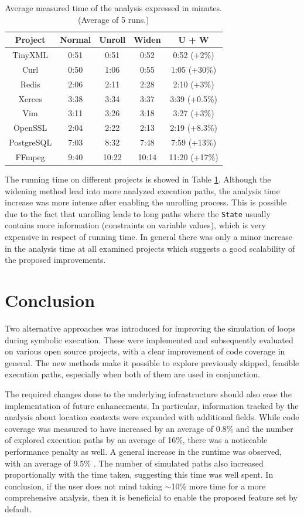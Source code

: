 \documentclass[oneside, a4paper, 12pt]{article}
\theoremstyle{definition}
\begin{document}
\begin{table}[!htb]
	\centering
\begin{tabular}{ |c||c|c|c|c| } 
	\hline
	Project & Normal & Unroll & Widen & U + W \\
	\hline \hline
	TinyXML & 0:51 & 0:51 & 0:52 & 0:52 (+2\%) \\ 
	\hline
	Curl & 0:50 & 1:06 & 0:55 & 1:05 (+30\%) \\ 
	\hline
	Redis & 2:06 & 2:11 & 2:28 & 2:10 (+3\%) \\ 
	\hline
	Xerces & 3:38 & 3:34 & 3:37 & 3:39 (+0.5\%) \\ 
	\hline
	Vim & 3:11 & 3:26 & 3:18 & 3:27 (+3\%) \\
	\hline
	OpenSSL & 2:04 & 2:22 & 2:13 & 2:19 (+8.3\%) \\
	\hline
	PostgreSQL & 7:03 & 8:32 & 7:48 & 7:59 (+13\%) \\
	\hline
	FFmpeg & 9:40 & 10:22 & 10:14 & 11:20 (+17\%) \\
	\hline
\end{tabular}
\caption{Average measured time of the analysis expressed in minutes. 
(Average of 5 runs.)}\label{tab:time}
\end{table} 
The running time on different projects is showed in Table \ref{tab:time}.
Although the widening method lead into more analyzed execution paths, the analysis time increase was more intense after enabling the unrolling process. This is possible due to the fact that unrolling leads to long paths where the \texttt{State} usually contains more information (constraints on variable values), which is very expensive in respect of running time. 
In general there was only a minor increase in the analysis time at all examined projects which suggests a good scalability of the proposed improvements.

\section{Conclusion}

Two alternative approaches was introduced for improving the simulation of loops during symbolic 
execution. These were implemented and subsequently evaluated on various open 
source projects, with a clear improvement of code coverage in general. The new methods make it possible to explore previously skipped, feasible execution paths, especially when both of them are used in conjunction.

The required changes done to the underlying infrastructure should also ease the 
implementation of future enhancements. In particular, information tracked by the 
analysis about location contexts were expanded with additional fields.
While code coverage was measured to have increased by an average of 0.8\% and the 
number of explored execution paths by an average of 16\%, there 
was a noticeable performance penalty as well. A general increase in the runtime was observed, with an average of 9.5\% . The number of simulated paths also increased proportionally with the time taken, suggesting this time was well 
spent. In conclusion, if the user does not mind taking $\sim$10\% more time
for a more comprehensive analysis, then it is beneficial to enable the proposed
feature set by default. 
\end{document}
